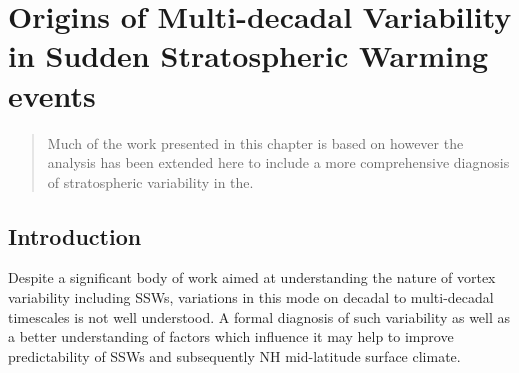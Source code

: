 \chapter{Origins of Multi-decadal Variability in Sudden Stratospheric Warming events}
\label{cha:models}
\begin{quotation}
  Much of the work presented in this chapter is based on \cite{dimdore-milesOrigins2020} however the analysis has been extended here to include a more comprehensive diagnosis of stratospheric variability in the.
\end{quotation}


\section{Introduction}
\label{sec:origins_introduction}
Despite a significant body of work aimed at understanding the nature of vortex variability including SSWs, variations in this mode on decadal to multi-decadal timescales is not well understood. A formal diagnosis of such variability as well as a better understanding of factors which influence it may help to improve predictability of SSWs and subsequently NH mid-latitude surface climate.

